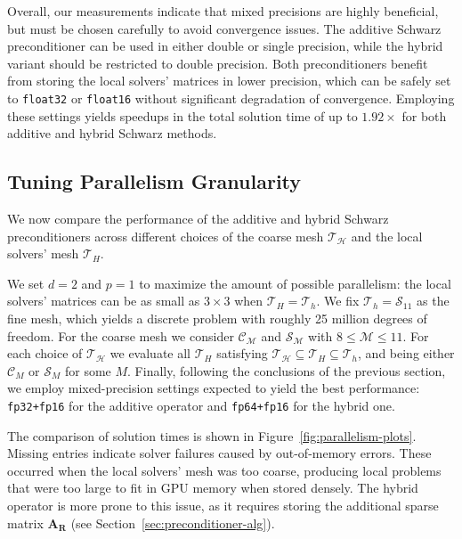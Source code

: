 \documentclass[11pt]{article}
\theoremstyle{definition}
\theoremstyle{theorem}
\begin{document}
Overall, our measurements indicate that mixed precisions are highly beneficial,
but must be chosen carefully to avoid convergence issues. The additive Schwarz
preconditioner can be used in either double or single precision,
while the hybrid variant should be restricted to double precision.
Both preconditioners benefit from storing the local solvers' matrices
in lower precision, which can be safely set to \verb|float32| or \verb|float16|
without significant degradation of convergence. Employing these settings
yields speedups in the total solution time of up to $1.92\times$ for both
additive and hybrid Schwarz methods.

\subsection{Tuning Parallelism Granularity}
\label{sec:experiments-parallelism}

We now compare the performance of the additive and hybrid Schwarz preconditioners
across different choices of the coarse mesh $\mathcal{T}_\mathcal{H}$ and the
local solvers' mesh $\mathcal{T}_H$.

We set $d=2$ and $p=1$ to maximize the amount of possible parallelism: the local solvers' matrices
can be as small as $3\times 3$ when $\mathcal{T}_H=\mathcal{T}_h$. We fix
$\mathcal{T}_h=\mathcal{S}_{11}$ as the fine mesh, which yields a discrete problem
with roughly 25 million degrees of freedom. For the coarse mesh we consider
$\mathcal{C}_\mathcal{M}$ and $\mathcal{S}_\mathcal{M}$ with $8\leq \mathcal{M}\leq 11$.
For each choice of $\mathcal{T}_\mathcal{H}$ we evaluate all $\mathcal{T}_H$
satisfying $\mathcal{T}_\mathcal{H}\subseteq \mathcal{T}_H\subseteq \mathcal{T}_h$,
and being either $\mathcal{C}_M$ or $\mathcal{S}_M$ for some $M$. Finally,
following the conclusions of the previous section, we employ mixed\nobreakdash-precision
settings expected to yield the best performance: \verb|fp32+fp16| for the
additive operator and \verb|fp64+fp16| for the hybrid one.

The comparison of solution times is shown in Figure~\ref{fig:parallelism-plots}.
Missing entries indicate solver failures caused by out-of-memory errors. These occurred
when the local solvers' mesh was too coarse, producing local problems
that were too large to fit in GPU memory when stored densely.
The hybrid operator is more prone to this issue, as it requires storing the
additional sparse matrix $\bm{A_R}$ (see Section~\ref{sec:preconditioner-alg}).
\end{document}
